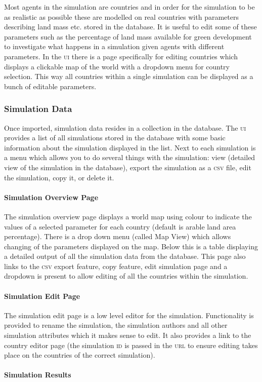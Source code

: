 Most agents in the simulation are countries and in order for the simulation to be as realistic as possible these are modelled on real countries with parameters describing land mass etc. stored in the database. It is useful to edit some of these parameters such as the percentage of land mass available for green development to investigate what happens in a simulation given agents with different parameters. In the \textsc{ui} there is a page specifically for editing countries which displays a clickable map of the world with a dropdown menu for country selection. This way all countries within a single simulation can be displayed as a bunch of editable parameters.


\subsubsection{Simulation Data}

Once imported, simulation data resides in a collection in the database. The \textsc{ui} provides a list of all simulations stored in the database with some basic information about the simulation displayed in the list. Next to each simulation is a menu which allows you to do several things with the simulation: view (detailed view of the simulation in the database),  export the simulation as a \textsc{csv} file, edit the simulation, copy it, or delete it.

\paragraph{Simulation Overview Page}


The simulation overview page displays a world map using colour to indicate the values of a selected parameter for each country (default is arable land area percentage). There is a drop down menu (called Map View) which allows changing of the parameters displayed on the map. Below this is a table displaying a detailed output of all the simulation data from the database. This page also links to the \textsc{csv} export feature, copy feature, edit simulation page and a dropdown is present to allow editing of all the countries within the simulation.

\paragraph{Simulation Edit Page}

 
The simulation edit page is a low level editor for the simulation. Functionality is provided to rename the simulation, the simulation authors and all other simulation attributes which it makes sense to edit. It also provides a link to the country editor page (the simulation \textsc{id} is passed in the \textsc{url} to ensure editing takes place on the countries of the correct simulation).

\paragraph{Simulation Results} %

%
%
